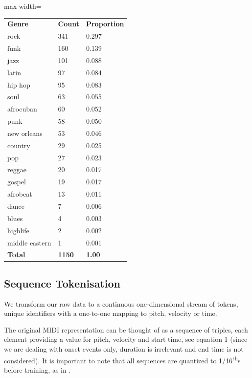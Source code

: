 \documentclass[sigconf]{nimeart}
\begin{document}
{\def\LTcaptype{none} %
\begin{table}[htbp]\centering\small
\begin{adjustbox}{max width=\columnwidth}\begin{tabular}{lll}
\toprule\noalign{}
\midrule
\textbf{Genre} & \textbf{Count} & \textbf{Proportion} \\
rock & 341 & 0.297 \\
funk & 160 & 0.139 \\
jazz & 101 & 0.088 \\
latin & 97 & 0.084 \\
hip hop & 95 & 0.083 \\
soul & 63 & 0.055 \\
afrocuban & 60 & 0.052 \\
punk & 58 & 0.050 \\
new orleans & 53 & 0.046 \\
country & 29 & 0.025 \\
pop & 27 & 0.023 \\
reggae & 20 & 0.017 \\
gospel & 19 & 0.017 \\
afrobeat & 13 & 0.011 \\
dance & 7 & 0.006 \\
blues & 4 & 0.003 \\
highlife & 2 & 0.002 \\
middle eastern & 1 & 0.001 \\
\textbf{Total} & \textbf{1150} & \textbf{1.00} \\
\bottomrule
\end{tabular}\end{adjustbox}\end{table}
}

\subsection{Sequence Tokenisation}\label{sequence-tokenisation}

We transform our raw data to a continuous one-dimensional stream of tokens, unique identifiers with a one-to-one mapping to pitch, velocity or time.

The original MIDI representation can be thought of as a sequence of triples, each element providing a value for pitch, velocity and start time, see equation 1 (since we are dealing with onset events only, duration is irrelevant and end time is not considered). It is important to note that all sequences are quantized to 1/16\textsuperscript{th}s before training, as in \cite{c9}.
\end{document}
